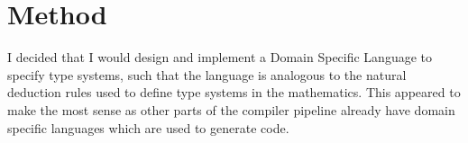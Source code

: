 \chapter{Method}
I decided that I would design and implement a Domain Specific Language to specify type systems, such that the language is analogous to the natural deduction rules used to define type systems in the mathematics.
This appeared to make the most sense as other parts of the compiler pipeline already have domain specific languages which are used to generate code.


